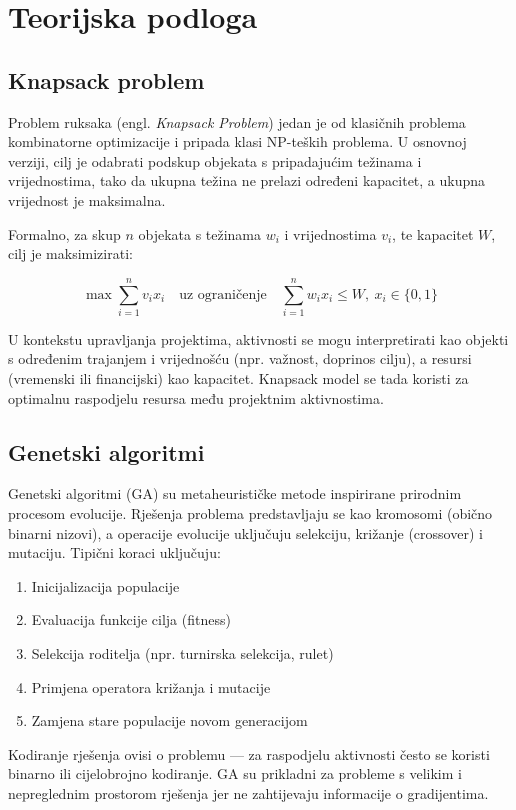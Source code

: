 \section{Teorijska podloga}

\subsection{Knapsack problem}
Problem ruksaka (engl. \textit{Knapsack Problem}) jedan je od klasičnih problema kombinatorne optimizacije i pripada klasi NP-teških problema. U osnovnoj verziji, cilj je odabrati podskup objekata s pripadajućim težinama i vrijednostima, tako da ukupna težina ne prelazi određeni kapacitet, a ukupna vrijednost je maksimalna.

Formalno, za skup $n$ objekata s težinama $w_i$ i vrijednostima $v_i$, te kapacitet $W$, cilj je maksimizirati:

\[
\max \sum_{i=1}^n v_i x_i \quad \text{uz ograničenje} \quad \sum_{i=1}^n w_i x_i \leq W,\ x_i \in \{0,1\}
\]

U kontekstu upravljanja projektima, aktivnosti se mogu interpretirati kao objekti s određenim trajanjem i vrijednošću (npr. važnost, doprinos cilju), a resursi (vremenski ili financijski) kao kapacitet. Knapsack model se tada koristi za optimalnu raspodjelu resursa među projektnim aktivnostima.

\subsection{Genetski algoritmi}

Genetski algoritmi (GA) su metaheurističke metode inspirirane prirodnim procesom evolucije. Rješenja problema predstavljaju se kao kromosomi (obično binarni nizovi), a operacije evolucije uključuju selekciju, križanje (crossover) i mutaciju. Tipični koraci uključuju:

\begin{enumerate}
    \item Inicijalizacija populacije
    \item Evaluacija funkcije cilja (fitness)
    \item Selekcija roditelja (npr. turnirska selekcija, rulet)
    \item Primjena operatora križanja i mutacije
    \item Zamjena stare populacije novom generacijom
\end{enumerate}

Kodiranje rješenja ovisi o problemu — za raspodjelu aktivnosti često se koristi binarno ili cijelobrojno kodiranje. GA su prikladni za probleme s velikim i nepreglednim prostorom rješenja jer ne zahtijevaju informacije o gradijentima.

